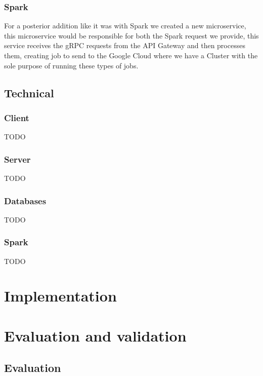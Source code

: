 \documentclass{article}
\newcommand*\fpar{\hspace{1ex}}
\begin{document}
    \subsubsection{Spark}
    \fpar For a posterior addition like it was with Spark we created a new microservice, this microservice would be responsible for both the Spark request we provide, this service receives the gRPC requests from the API Gateway and then processes them, creating job to send to the Google Cloud where we have a Cluster with the sole purpose of running these types of jobs.

  \subsection{Technical}
    \subsubsection{Client}
    \fpar TODO

    \subsubsection{Server}
    \fpar TODO

    \subsubsection{Databases}
    \fpar TODO

    \subsubsection{Spark}
    \fpar TODO

\section{Implementation}
\label{sec:implementation}


\section{Evaluation and validation}
\label{sec:evaluation_and_validation}

    \subsection{Evaluation}
    \label{sec:evaluation}
\end{document}
